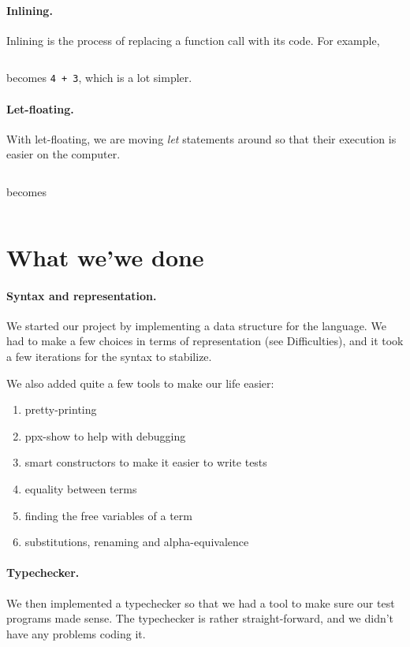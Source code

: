 \documentclass{article}
\begin{document}
\paragraph{Inlining.}Inlining is the process of replacing a function call with
its code.
For example, 
\inputminted{haskell}{inlining.ml} 
becomes {\tt 4 + 3}, which is a lot simpler.

\paragraph{Let-floating.}With let-floating, we are moving {\em let} statements around
so that their execution is easier on the computer.

\inputminted{haskell}{let-floating.ml}
becomes
\inputminted{haskell}{let-floating2.ml}

\section{What we'we done}

\paragraph{Syntax and representation.}We started our project by implementing a data structure 
for the language. We had to make a few choices in terms of representation (see Difficulties),
and it took a few iterations for the syntax to stabilize.

We also added quite a few tools to make our life easier:
\begin{enumerate}
  \item pretty-printing
  \item ppx-show to help with debugging
  \item smart constructors to make it easier to write tests
  \item equality between terms
  \item finding the free variables of a term
  \item substitutions, renaming and alpha-equivalence
\end{enumerate}

\paragraph{Typechecker.}We then implemented a typechecker so that we had a tool to make sure
our test programs made sense. The typechecker is rather straight-forward, and we didn't have any
problems coding it.
\end{document}
